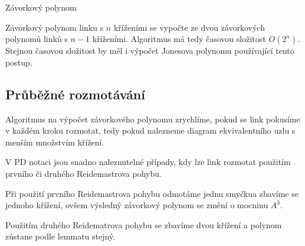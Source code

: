 \begin{algorithm}[H]

\DontPrintSemicolon

%




\caption{Závorkový polynom} 
\end{algorithm}

Závorkový polynom linku s $n$ kříženími se vypočte ze dvou závorkových polynomů linků s $n-1$ kříženími. Algoritmus má tedy časovou složitost $O(2^n)$. Stejnou časovou složitost by měl i výpočet Jonesova polynomu používající tento postup.

\subsection{Průběžné rozmotávání}
Algoritmus na výpočet závorkového polynomu zrychlíme, pokud se link pokusíme v každém kroku rozmotat, tedy pokud nalezneme diagram ekvivalentního uzlu s menším množstvím křížení. 

V PD notaci jsou snadno naleznutelné případy, kdy lze link rozmotat použitím prvního či druhého Reidemastrova pohybu.

Při použití prvního Reidemastrova pohybu odmotáme jednu smyčkua zbavíme se jednoho křížení, ovšem výsledný závorkový polynom se změní o mocninu $A^3$.

Použitím druhého Reidematrova pohybu se zbavíme dvou křížení a polynom zůstane podle lemmatu stejný.

